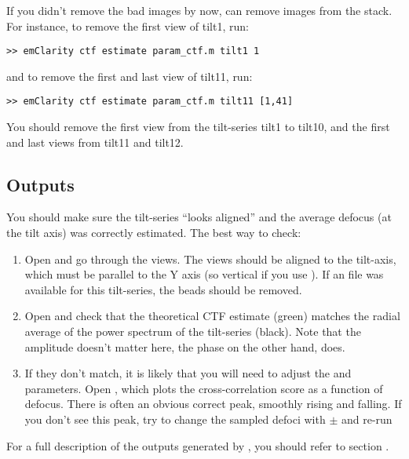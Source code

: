 If you didn't remove the bad images by now,  can remove images from the stack. For instance, to remove the first view of tilt1, run:
\begin{lstlisting}
>> emClarity ctf estimate param_ctf.m tilt1 1
\end{lstlisting}

and to remove the first and last view of tilt11, run:
\begin{lstlisting}
>> emClarity ctf estimate param_ctf.m tilt11 [1,41]
\end{lstlisting}

\begin{note}You should remove the first view from the tilt-series tilt1 to tilt10, and the first and last views from tilt11 and tilt12.
\end{note}

\subsection{Outputs}

You should make sure the tilt-series ``looks aligned'' and the average defocus (at the tilt axis) was correctly estimated. The best way to check:
\begin{enumerate}
    \item Open  and go through the views. The views should be aligned to the tilt-axis, which must be parallel to the Y axis (so vertical if you use {\threedmod}). If an  file was available for this tilt-series, the beads should be removed.
    \item Open  and check that the theoretical CTF estimate (green) matches the radial average of the power spectrum of the tilt-series (black). Note that the amplitude doesn't matter here, the phase on the other hand, does.
    \item If they don't match, it is likely that you will need to adjust the  and  parameters. Open , which plots the cross-correlation score as a function of defocus. There is often an obvious correct peak, smoothly rising and falling. If you don't see this peak, try to change the sampled defoci with  $\pm$ and re-run 
\end{enumerate}

\begin{note}For a full description of the outputs generated by , you should refer to section .
\end{note}